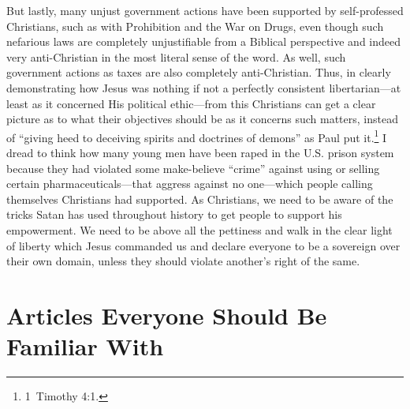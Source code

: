 \documentclass[letterpaper,12pt]{article}
\begin{document}
But lastly, many unjust government actions have been supported by self-professed Christians, such as with Prohibition and the War on Drugs, even though such nefarious laws are completely unjustifiable from a Biblical perspective and indeed very anti-Christian in the most literal sense of the word. As well, such government actions as taxes are also completely anti-Christian. Thus, in clearly demonstrating how Jesus was nothing if not a perfectly consistent libertarian---at least as it concerned His political ethic---from this Christians can get a clear picture as to what their objectives should be as it concerns such matters, instead of ``giving heed to deceiving spirits and doctrines of demons'' as Paul put it.\footnote{1~Timothy 4:1.} I dread to think how many young men have been raped in the U.S. prison system because they had violated some make-believe ``crime'' against using or selling certain pharmaceuticals---that aggress against no one---which people calling themselves Christians had supported. As Christians, we need to be aware of the tricks Satan has used throughout history to get people to support his empowerment. We need to be above all the pettiness and walk in the clear light of liberty which Jesus commanded us and declare everyone to be a sovereign over their own domain, unless they should violate another's right of the same.

\appendix
\appendixpage

\section{Articles Everyone Should Be Familiar With}
\label{sec:AppendixArticlesEveryoneShouldBeFamiliarWith}
\end{document}
